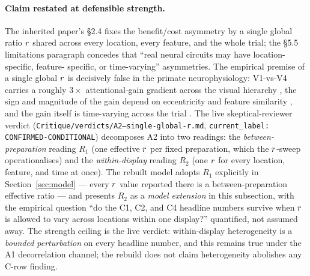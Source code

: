 \paragraph{Claim restated at defensible strength.}
The inherited paper's §2.4 fixes the benefit/cost asymmetry by a
single global ratio $r$ shared across every location, every
feature, and the whole trial; the §5.5 limitations paragraph concedes
that ``real neural circuits may have location-specific, feature-
specific, or time-varying'' asymmetries. The empirical premise of a
single global $r$ is decisively false in the primate
neurophysiology: V1-vs-V4 carries a roughly $3\times$
attentional-gain gradient across the visual hierarchy
\cite{mcadams_maunsell1999_v4_tuning,reynolds_heeger2009_normalization},
the sign and magnitude of the gain depend on eccentricity and
feature similarity
\cite{carrasco2011_visual_attention_25y,treue_martinez_trujillo1999_feature_attention},
and the gain itself is time-varying across the trial
\cite{ghose_maunsell2002_task_timing,sani2017_temporal_v4_gain}. The
live skeptical-reviewer verdict
(\texttt{Critique/verdicts/A2--single-global-r.md},
\texttt{current\_label: CONFIRMED-CONDITIONAL}) decomposes A2 into two
readings: the \emph{between-preparation} reading $R_1$
(one effective $r$ per fixed preparation, which the
$r$-sweep operationalises) and the \emph{within-display} reading
$R_2$ (one $r$ for every location, feature, and time at once).
The rebuilt model adopts $R_1$ explicitly in
Section~\ref{sec:model} — every $r$ value reported there is a
between-preparation effective ratio — and presents $R_2$ as a
\emph{model extension} in this subsection, with the empirical
question ``do the C1, C2, and C4 headline numbers survive when
$r$ is allowed to vary across locations within one display?''
quantified, not assumed away. The strength ceiling is the live
verdict: within-display heterogeneity is a \emph{bounded perturbation}
on every headline number, and this remains true under the A1
decorrelation channel; the rebuild does not claim heterogeneity
abolishes any C-row finding.

